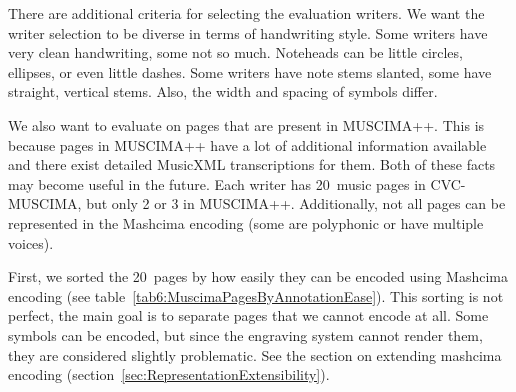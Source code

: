 There are additional criteria for selecting the evaluation writers. We want the writer selection to be diverse in terms of handwriting style. Some writers have very clean handwriting, some not so much. Noteheads can be little circles, ellipses, or even little dashes. Some writers have note stems slanted, some have straight, vertical stems. Also, the width and spacing of symbols differ.

We also want to evaluate on pages that are present in MUSCIMA++. This is because pages in MUSCIMA++ have a lot of additional information available and there exist detailed MusicXML transcriptions for them. Both of these facts may become useful in the future. Each writer has 20~music pages in CVC-MUSCIMA, but only 2 or 3 in MUSCIMA++. Additionally, not all pages can be represented in the Mashcima encoding (some are polyphonic or have multiple voices).

First, we sorted the 20~pages by how easily they can be encoded using Mashcima encoding (see table~\ref{tab6:MuscimaPagesByAnnotationEase}). This sorting is not perfect, the main goal is to separate pages that we cannot encode at all. Some symbols can be encoded, but since the engraving system cannot render them, they are considered slightly problematic. See the section on extending mashcima encoding (section~\ref{sec:RepresentationExtensibility}).

